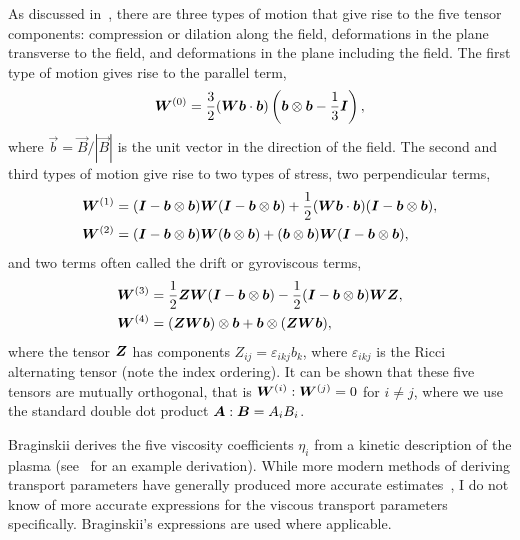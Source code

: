 As discussed in~\cite{kaufmanPlasmaViscosityMagnetic1960}, there are three types of motion that give rise to the five tensor components: compression or dilation along the field, deformations in the plane transverse to the field, and deformations in the plane including the field. The first type of motion gives rise to the parallel term,
\begin{equation}
  \label{eq:braginskii_parallel_term}
  {\bm W}^{(0)} = \frac{3}{2}({\bm W}{\bm b}\cdot{\bm b}) \left( {\bm b} \otimes {\bm b} - \frac{1}{3}{\bm I} \right),
\end{equation}
where $\vec{b} = \vec{B}/|\vec{B}|$ is the unit vector in the direction of the field. The second and third types of motion give rise to two types of stress, two perpendicular terms,
\begin{align}
{\bm W}^{(1)} &= ({\bm I} - {\bm b} \otimes {\bm b}){\bm W}({\bm I} - {\bm b} \otimes {\bm b}) + \frac{1}{2}({\bm W}{\bm b} \cdot {\bm b})({\bm I} - {\bm b} \otimes {\bm b}), \\
{\bm W}^{(2)} &= ({\bm I} - {\bm b} \otimes {\bm b}){\bm W}({\bm b} \otimes {\bm b}) + ({\bm b} \otimes {\bm b}){\bm W}({\bm I} - {\bm b} \otimes {\bm b}),  \\
\end{align}
and two terms often called the drift or gyroviscous terms,
\begin{align}
{\bm W}^{(3)} &= \frac{1}{2} {\bm Z}{\bm W}({\bm I} - {\bm b} \otimes {\bm b}) - \frac{1}{2}({\bm I} - {\bm b} \otimes {\bm b}){\bm W}{\bm Z}, \\
{\bm W}^{(4)} &= ({\bm Z}{\bm W}{\bm b}) \otimes {\bm b} + {\bm b} \otimes ({\bm Z} {\bm W} {\bm b}), \\
\label{eq:drift_terms}
\end{align}
where the tensor ${\bm Z}$ has components $Z_{ij} = \varepsilon_{ikj}b_k$, where $\varepsilon_{ikj}$ is the Ricci alternating tensor (note the index ordering). It can be shown that these five tensors are mutually orthogonal, that is ${\bm W}^{(i)}:{\bm W}^{(j)} = 0$ for $i\ne j$, where we use the standard double dot product ${\bm A}:{\bm B} = A_iB_i$.

Braginskii derives the five viscosity coefficients $\eta_i$ from a kinetic description of the plasma (see~\cite{epperleinPlasmaTransportCoefficients1986} for an example derivation). While more modern methods of deriving transport parameters have generally produced more accurate estimates~\cite{epperleinPlasmaTransportCoefficients1986}, I do not know of more accurate expressions for the viscous transport parameters specifically. Braginskii's expressions are used where applicable.

